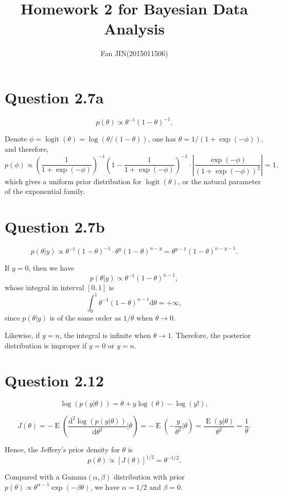 \documentclass{article}
\DeclareMathOperator*{\logit}{logit}
\DeclareMathOperator*{\expec}{E}
\begin{document}
\title{\textsf{Homework 2 for Bayesian Data Analysis}}
\author{Fan JIN\quad (2015011506)}
\maketitle

\section*{Question 2.7a}
{
    $$p(\theta) \propto \theta^{-1} (1-\theta)^{-1}.$$

    Denote $\phi = \logit(\theta) = \log{(\theta / (1-\theta))}$, one has $\theta = 1/(1+\exp{(-\phi)})$, and therefore,
    $$p(\phi) \propto (\frac{1}{1 + \exp{(-\phi)}})^{-1} (1-\frac{1}{1 + \exp{(-\phi)}})^{-1} \cdot \left| \frac{\exp{(-\phi)}}{(1+\exp{(-\phi)})^2} \right| = 1,$$ which gives a uniform prior distribution for $\logit(\theta)$, or the natural parameter of the exponential family.
}

\section*{Question 2.7b}
{
    $$p(\theta|y) \propto \theta^{-1} (1-\theta)^{-1} \cdot \theta^{y} (1-\theta)^{n-y} = \theta^{y-1} (1-\theta)^{n-y-1}.$$

    If $y=0$, then we have $$p(\theta|y) \propto \theta^{-1} (1-\theta)^{n-1},$$ whose integral in interval $[0, 1]$ is 
    $$\int_0^1 {\theta^{-1} (1-\theta)^{n-1} \mathrm{d}\theta} = +\infty,$$ since $p(\theta|y)$ is of the same order as $1/\theta$ when $\theta \rightarrow 0$.

    Likewise, if $y=n$, the integral is infinite when $\theta \rightarrow 1$. Therefore, the posterior distribution is improper if $y=0$ or $y=n$.
}

\section*{Question 2.12}
{
    $$\log{(p(y|\theta))} = \theta + y \log{(\theta)} - \log{(y!)},$$

    $$J(\theta) = -\expec{( \frac{\mathrm{d}^2 \log{(p(y|\theta))}}{\mathrm{d}\theta^2} | \theta)} = -\expec{( -\frac{y}{\theta^2} | \theta)} = \frac{\expec{(y | \theta)}}{\theta^2} = \frac{1}{\theta}.$$

    Hence, the Jeffery's prior density for $\theta$ is $$p(\theta) \propto [J(\theta)]^{1/2} = \theta^{-1/2}.$$

    Compared with a $\mathrm{Gamma}(\alpha, \beta)$ distribution with prior $p(\theta) \propto \theta^{\alpha-1} \exp{(-\beta \theta)}$, we have $\alpha=1/2$ and $\beta=0$.
}
\end{document}
